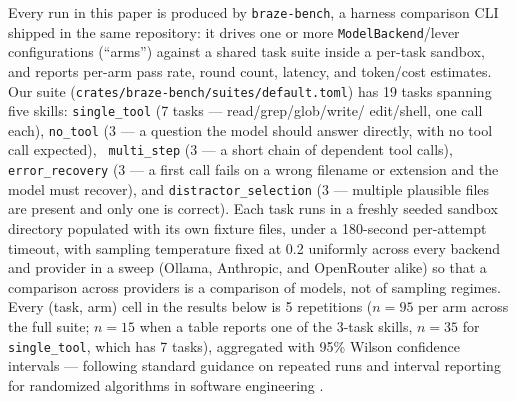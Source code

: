 \documentclass[smallcondensed,natbib]{svjour3}
\begin{document}
Every run in this paper is produced by \texttt{braze-bench}, a harness
comparison CLI shipped in the same repository: it drives one or more
\texttt{ModelBackend}/lever configurations (``arms'') against a shared
task suite inside a per-task sandbox, and reports per-arm pass rate,
round count, latency, and token/cost estimates. Our suite
(\texttt{crates/braze-bench/suites/default.toml}) has 19 tasks spanning
five skills: \texttt{single\_tool} (7 tasks --- read/grep/glob/write/
edit/shell, one call each), \texttt{no\_tool} (3 --- a question the
model should answer directly, with no tool call expected), \texttt{
multi\_step} (3 --- a short chain of dependent tool calls), \texttt{
error\_recovery} (3 --- a first call fails on a wrong filename or
extension and the model must recover), and \texttt{distractor\_selection}
(3 --- multiple plausible files are present and only one is correct).
Each task runs in a freshly seeded sandbox directory populated with its
own fixture files, under a 180-second per-attempt timeout, with sampling
temperature fixed at 0.2 uniformly across every backend and provider in
a sweep (Ollama, Anthropic, and OpenRouter alike) so that a comparison
across providers is a comparison of models, not of sampling regimes.
Every (task, arm) cell in the results below is 5 repetitions ($n{=}95$
per arm across the full suite; $n{=}15$ when a table reports one of the
3-task skills, $n{=}35$ for \texttt{single\_tool}, which has 7 tasks),
aggregated with 95\% Wilson confidence intervals --- following standard
guidance on repeated runs and interval reporting for randomized
algorithms in software engineering
\citep{wohlin2012experimentation,arcuri2011practical}.
\end{document}
